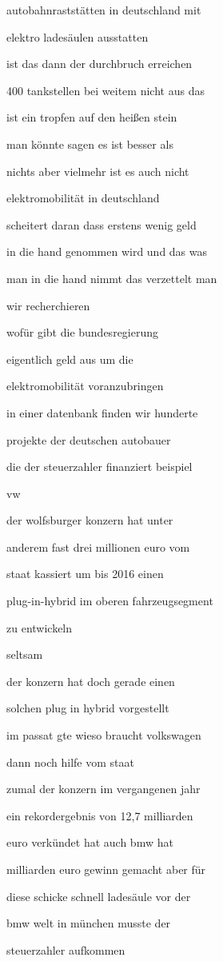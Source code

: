 \documentclass[a4paper, 11pt]{book} %
\begin{document}
autobahnraststätten in deutschland mit

elektro ladesäulen ausstatten

ist das dann der durchbruch erreichen

400 tankstellen bei weitem nicht aus das

ist ein tropfen auf den heißen stein

man könnte sagen es ist besser als

nichts aber vielmehr ist es auch nicht

elektromobilität in deutschland

scheitert daran dass erstens wenig geld

in die hand genommen wird und das was

man in die hand nimmt das verzettelt man

wir recherchieren

wofür gibt die bundesregierung

eigentlich geld aus um die

elektromobilität voranzubringen

in einer datenbank finden wir hunderte

projekte der deutschen autobauer

die der steuerzahler finanziert beispiel

vw

der wolfsburger konzern hat unter

anderem fast drei millionen euro vom

staat kassiert um bis 2016 einen

plug-in-hybrid im oberen fahrzeugsegment

zu entwickeln

seltsam

der konzern hat doch gerade einen

solchen plug in hybrid vorgestellt

im passat gte wieso braucht volkswagen

dann noch hilfe vom staat

zumal der konzern im vergangenen jahr

ein rekordergebnis von 12,7 milliarden

euro verkündet hat auch bmw hat

milliarden euro gewinn gemacht aber für

diese schicke schnell ladesäule vor der

bmw welt in münchen musste der

steuerzahler aufkommen
\end{document}
